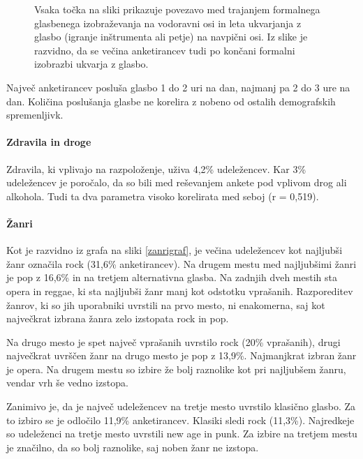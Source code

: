 \documentclass[a4paper, 12pt]{book}
\begin{document}
{\begin{figure}[hbt]
\caption{Vsaka točka na sliki prikazuje povezavo med trajanjem formalnega glasbenega izobraževanja na vodoravni osi in leta ukvarjanja z glasbo (igranje inštrumenta ali petje) na navpični osi.  Iz slike je razvidno, da se večina anketirancev tudi po končani formalni izobrazbi ukvarja z glasbo.  }
\label{ukvarjanjeglizobrazba}
\end{figure}

Največ anketirancev posluša glasbo 1 do 2 uri na dan, najmanj pa 2 do 3 ure na dan. Količina poslušanja glasbe ne korelira z nobeno od ostalih demografskih spremenljivk. 

\paragraph{Zdravila in droge}

Zdravila, ki vplivajo na razpoloženje, uživa 4,2\% udeležencev. Kar 3\% udeležencev je poročalo, da so bili med reševanjem ankete pod vplivom drog ali alkohola. Tudi ta dva parametra visoko korelirata med seboj (r = 0,519).

\paragraph{Žanri}

Kot je razvidno iz grafa na sliki \ref{zanrigraf}, je večina udeležencev kot najljubši žanr označila rock (31,6\% anketirancev). Na drugem mestu med najljubšimi žanri je pop z 16,6\% in na tretjem alternativna glasba. Na zadnjih dveh mestih sta opera in reggae, ki sta najljubši žanr manj kot odstotku vprašanih. Razporeditev žanrov, ki so jih uporabniki uvrstili na prvo mesto, ni enakomerna, saj kot največkrat izbrana žanra zelo izstopata rock in pop.  

Na drugo mesto je spet največ vprašanih uvrstilo rock (20\% vprašanih), drugi največkrat uvrščen žanr na drugo mesto je pop z 13,9\%. Najmanjkrat izbran žanr je opera. Na drugem mestu so izbire že bolj raznolike kot pri najljubšem žanru, vendar vrh še vedno izstopa. 

Zanimivo je, da je največ udeležencev na tretje mesto uvrstilo klasično glasbo. Za to izbiro se je odločilo 11,9\% anketirancev. Klasiki sledi rock (11,3\%). Najredkeje so udeleženci na tretje mesto uvrstili new age in punk. Za izbire na tretjem mestu je značilno, da so bolj raznolike, saj noben žanr ne izstopa. 

}
\end{document}
